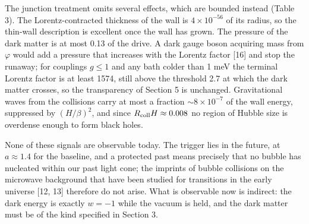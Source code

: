 \documentclass[preprint,12pt]{elsarticle}
\begin{document}
The junction treatment omits several effects, which are bounded instead (Table 3). The Lorentz-contracted thickness of the wall is $4\times10^{-56}$ of its radius, so the thin-wall description is excellent once the wall has grown. The pressure of the dark matter is at most 0.13 of the drive. A dark gauge boson acquiring mass from $\varphi$ would add a pressure that increases with the Lorentz factor [16] and stop the runaway; for couplings $g\le1$ and any bath colder than 1 meV the terminal Lorentz factor is at least 1574, still above the threshold 2.7 at which the dark matter crosses, so the transparency of Section 5 is unchanged. Gravitational waves from the collisions carry at most a fraction $\sim8\times10^{-7}$ of the wall energy, suppressed by $(H/\beta)^2$, and since $R_{\rm coll}H\approx0.008$ no region of Hubble size is overdense enough to form black holes.

None of these signals are observable today. The trigger lies in the future, at $a\approx1.4$ for the baseline, and a protected past means precisely that no bubble has nucleated within our past light cone; the imprints of bubble collisions on the microwave background that have been studied for transitions in the early universe [12, 13] therefore do not arise. What is observable now is indirect: the dark energy is exactly $w=-1$ while the vacuum is held, and the dark matter must be of the kind specified in Section 3.
\end{document}
